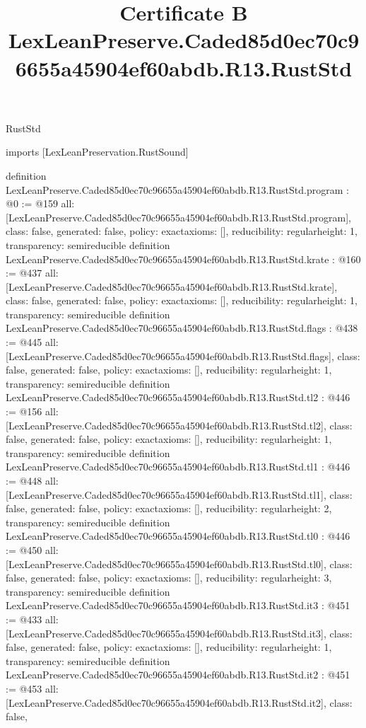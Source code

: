 \begin{lexlean}{RustStd}
\title{Certificate B LexLeanPreserve.Caded85d0ec70c96655a45904ef60abdb.R13.RustStd}
\begin{coremodule}
imports [LexLeanPreservation.RustSound]

definition LexLeanPreserve.Caded85d0ec70c96655a45904ef60abdb.R13.RustStd.program : @0 := @159 {
  all: [LexLeanPreserve.Caded85d0ec70c96655a45904ef60abdb.R13.RustStd.program],
  class: false,
  generated: false,
  policy: exact{axioms: []},
  reducibility: regular{height: 1},
  transparency: semireducible
}
definition LexLeanPreserve.Caded85d0ec70c96655a45904ef60abdb.R13.RustStd.krate : @160 := @437 {
  all: [LexLeanPreserve.Caded85d0ec70c96655a45904ef60abdb.R13.RustStd.krate],
  class: false,
  generated: false,
  policy: exact{axioms: []},
  reducibility: regular{height: 1},
  transparency: semireducible
}
definition LexLeanPreserve.Caded85d0ec70c96655a45904ef60abdb.R13.RustStd.flags : @438 := @445 {
  all: [LexLeanPreserve.Caded85d0ec70c96655a45904ef60abdb.R13.RustStd.flags],
  class: false,
  generated: false,
  policy: exact{axioms: []},
  reducibility: regular{height: 1},
  transparency: semireducible
}
definition LexLeanPreserve.Caded85d0ec70c96655a45904ef60abdb.R13.RustStd.tl2 : @446 := @156 {
  all: [LexLeanPreserve.Caded85d0ec70c96655a45904ef60abdb.R13.RustStd.tl2],
  class: false,
  generated: false,
  policy: exact{axioms: []},
  reducibility: regular{height: 1},
  transparency: semireducible
}
definition LexLeanPreserve.Caded85d0ec70c96655a45904ef60abdb.R13.RustStd.tl1 : @446 := @448 {
  all: [LexLeanPreserve.Caded85d0ec70c96655a45904ef60abdb.R13.RustStd.tl1],
  class: false,
  generated: false,
  policy: exact{axioms: []},
  reducibility: regular{height: 2},
  transparency: semireducible
}
definition LexLeanPreserve.Caded85d0ec70c96655a45904ef60abdb.R13.RustStd.tl0 : @446 := @450 {
  all: [LexLeanPreserve.Caded85d0ec70c96655a45904ef60abdb.R13.RustStd.tl0],
  class: false,
  generated: false,
  policy: exact{axioms: []},
  reducibility: regular{height: 3},
  transparency: semireducible
}
definition LexLeanPreserve.Caded85d0ec70c96655a45904ef60abdb.R13.RustStd.it3 : @451 := @433 {
  all: [LexLeanPreserve.Caded85d0ec70c96655a45904ef60abdb.R13.RustStd.it3],
  class: false,
  generated: false,
  policy: exact{axioms: []},
  reducibility: regular{height: 1},
  transparency: semireducible
}
definition LexLeanPreserve.Caded85d0ec70c96655a45904ef60abdb.R13.RustStd.it2 : @451 := @453 {
  all: [LexLeanPreserve.Caded85d0ec70c96655a45904ef60abdb.R13.RustStd.it2],
  class: false,
}
\end{coremodule}
\end{lexlean}

